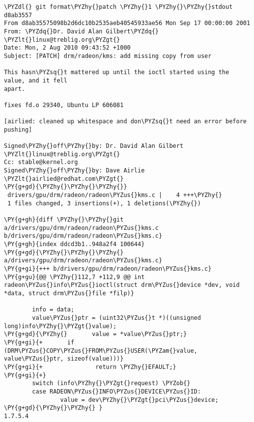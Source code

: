 \begin{Verbatim}[commandchars=\\\{\}]
\PYZdl{} git format\PYZhy{}patch \PYZhy{}1 \PYZhy{}\PYZhy{}stdout d8ab3557
From d8ab35575098b2d6dc10b2535aeb40545933ae56 Mon Sep 17 00:00:00 2001
From: \PYZdq{}Dr. David Alan Gilbert\PYZdq{} \PYZlt{}linux@treblig.org\PYZgt{}
Date: Mon, 2 Aug 2010 09:43:52 +1000
Subject: [PATCH] drm/radeon/kms: add missing copy from user

This hasn\PYZsq{}t mattered up until the ioctl started using the value, and it fell
apart.

fixes fd.o 29340, Ubuntu LP 606081

[airlied: cleaned up whitespace and don\PYZsq{}t need an error before pushing]

Signed\PYZhy{}off\PYZhy{}by: Dr. David Alan Gilbert \PYZlt{}linux@treblig.org\PYZgt{}
Cc: stable@kernel.org
Signed\PYZhy{}off\PYZhy{}by: Dave Airlie \PYZlt{}airlied@redhat.com\PYZgt{}
\PY{g+gd}{\PYZhy{}\PYZhy{}\PYZhy{}}
 drivers/gpu/drm/radeon/radeon\PYZus{}kms.c |    4 +++\PYZhy{}
 1 files changed, 3 insertions(+), 1 deletions(\PYZhy{})

\PY{g+gh}{diff \PYZhy{}\PYZhy{}git a/drivers/gpu/drm/radeon/radeon\PYZus{}kms.c b/drivers/gpu/drm/radeon/radeon\PYZus{}kms.c}
\PY{g+gh}{index ddcd3b1..948a2f4 100644}
\PY{g+gd}{\PYZhy{}\PYZhy{}\PYZhy{} a/drivers/gpu/drm/radeon/radeon\PYZus{}kms.c}
\PY{g+gi}{+++ b/drivers/gpu/drm/radeon/radeon\PYZus{}kms.c}
\PY{g+gu}{@@ \PYZhy{}112,7 +112,9 @@ int radeon\PYZus{}info\PYZus{}ioctl(struct drm\PYZus{}device *dev, void *data, struct drm\PYZus{}file *filp)}

        info = data;
        value\PYZus{}ptr = (uint32\PYZus{}t *)((unsigned long)info\PYZhy{}\PYZgt{}value);
\PY{g+gd}{\PYZhy{}       value = *value\PYZus{}ptr;}
\PY{g+gi}{+       if (DRM\PYZus{}COPY\PYZus{}FROM\PYZus{}USER(\PYZam{}value, value\PYZus{}ptr, sizeof(value)))}
\PY{g+gi}{+               return \PYZhy{}EFAULT;}
\PY{g+gi}{+}
        switch (info\PYZhy{}\PYZgt{}request) \PYZob{}
        case RADEON\PYZus{}INFO\PYZus{}DEVICE\PYZus{}ID:
                value = dev\PYZhy{}\PYZgt{}pci\PYZus{}device;
\PY{g+gd}{\PYZhy{}\PYZhy{} }
1.7.5.4
\end{Verbatim}
